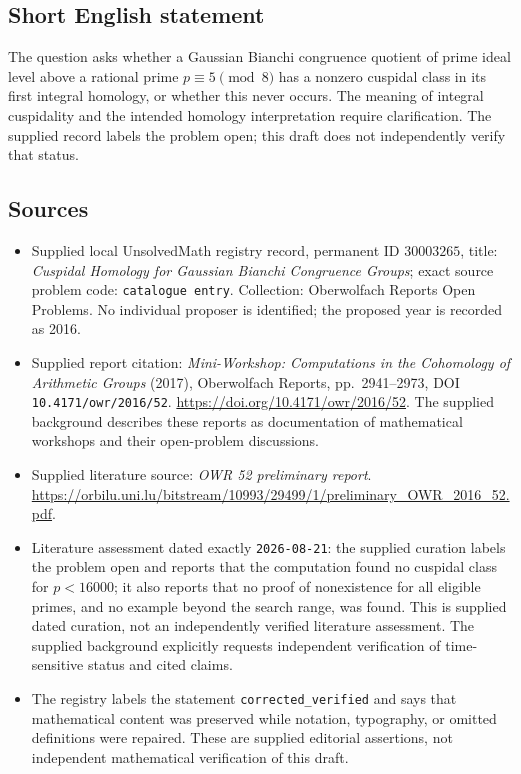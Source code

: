 \documentclass[11pt]{article}
\begin{document}
\subsection{Short English statement}
The question asks whether a Gaussian Bianchi congruence quotient of prime ideal level above a rational prime \(p\equiv5\pmod8\) has a nonzero cuspidal class in its first integral homology, or whether this never occurs. The meaning of integral cuspidality and the intended homology interpretation require clarification. The supplied record labels the problem open; this draft does not independently verify that status.
\subsection{Sources}
\begin{itemize}
\item Supplied local UnsolvedMath registry record, permanent ID \(30003265\), title: \emph{Cuspidal Homology for Gaussian Bianchi Congruence Groups}; exact source problem code: \texttt{catalogue entry}. Collection: Oberwolfach Reports Open Problems. No individual proposer is identified; the proposed year is recorded as 2016.
\item Supplied report citation: \emph{Mini-Workshop: Computations in the Cohomology of Arithmetic Groups} (2017), Oberwolfach Reports, pp.~2941--2973, DOI \texttt{10.4171/owr/2016/52}. \url{https://doi.org/10.4171/owr/2016/52}. The supplied background describes these reports as documentation of mathematical workshops and their open-problem discussions.
\item Supplied literature source: \emph{OWR 52 preliminary report}. \url{https://orbilu.uni.lu/bitstream/10993/29499/1/preliminary_OWR_2016_52.pdf}.
\item Literature assessment dated exactly \texttt{2026-08-21}: the supplied curation labels the problem open and reports that the computation found no cuspidal class for \(p<16000\); it also reports that no proof of nonexistence for all eligible primes, and no example beyond the search range, was found. This is supplied dated curation, not an independently verified literature assessment. The supplied background explicitly requests independent verification of time-sensitive status and cited claims.
\item The registry labels the statement \texttt{corrected\_verified} and says that mathematical content was preserved while notation, typography, or omitted definitions were repaired. These are supplied editorial assertions, not independent mathematical verification of this draft.
\end{itemize}
\end{document}
